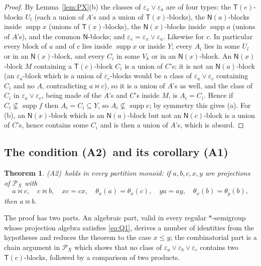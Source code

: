 \documentclass[11pt]{amsart}
\newtheorem{theorem}{Theorem}[section]
\theoremstyle{definition}
\renewcommand{\P}{\mathcal{P}}      %
\newcommand{\supp}{\operatorname{supp}}
\newcommand{\T}{\mathsf{T}}
\newcommand{\N}{\mathsf{N}}
\newcommand{\mt}{\bowtie}      %
\newcommand{\Rcond}{\textup{(A1)}}     %
\newcommand{\Rp}{\textup{(A2)}}        %
\begin{document}
\begin{proof}
By Lemma~\ref{lem:PX}(b) the classes of $\varepsilon_x\vee\varepsilon_a$ are of four types: the $\T(e)$-blocks $U_l$ (each a union of $A$'s and a union of $\T(x)$-blocks), the $\N(a)$-blocks inside $\supp x$ (unions of $\T(x)$-blocks), the $\N(x)$-blocks inside $\supp a$ (unions of $A$'s), and the common $\N$-blocks; and $\varepsilon_e=\varepsilon_x\vee\varepsilon_a$. Likewise for $c$. In particular every block of $a$ and of $c$ lies inside $\supp x$ or inside $Y$; every $A_i$ lies in some $U_l$ or in an $\N(x)$-block, and every $C_i$ in some $V_k$ or in an $\N(x)$-block. An $\N(x)$-block $M$ containing a $\T(c)$-block $C_i$ is a union of $C$'s; it is not an $\N(a)$-block (an $\varepsilon_a$-block which is a union of $\varepsilon_c$-blocks would be a class of $\varepsilon_a\vee\varepsilon_c$ containing $C_i$ and no $A$, contradicting $a\mt c$), so it is a union of $A$'s as well, and the class of $C_i$ in $\varepsilon_a\vee\varepsilon_c$, being made of the $A$'s and $C$'s inside $M$, is $A_i=C_i$. Hence if $C_i\not\subseteq\supp f$ then $A_i=C_i\subseteq Y$, so $A_i\not\subseteq\supp e$; by symmetry this gives (a). For (b), an $\N(x)$-block which is an $\N(a)$-block but not an $\N(c)$-block is a union of $C$'s, hence contains some $C_i$ and is then a union of $A$'s, which is absurd.
\end{proof}

\subsection{The condition \Rp\ and its corollary \Rcond}\label{subsec:Rp}

\begin{theorem}\label{thm:Rp}
\Rp\ holds in every partition monoid: if $a,b,c,x,y$ are projections of $\P_X$ with
\[
a\mt c,\quad c\mt b,\quad xc=cx,\quad \theta_x(a)=\theta_x(c),\quad ya=ay,\quad \theta_x(b)=\theta_y(b),
\]
then $a\mt b$.
\end{theorem}

The proof has two parts. An algebraic part, valid in every regular $*$-semigroup whose projection algebra satisfies \eqref{eq:Q1}, derives a number of identities from the hypotheses and reduces the theorem to the case $x\le y$; the combinatorial part is a chain argument in $\P_X$ which shows that no class of $\varepsilon_a\vee\varepsilon_b\vee\varepsilon_c$ contains two $\T(c)$-blocks, followed by a comparison of two products.
\end{document}
